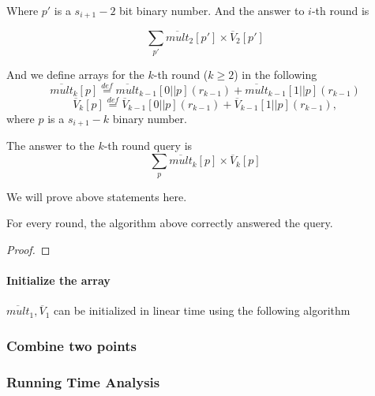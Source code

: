 Where $p'$ is a $s_{i+1}-2$ bit binary number. And the answer to $i$-th round is 

$$\sum_{p'}\overline{mult}_2[p']\times\overline{V}_2[p']$$

And we define arrays for the $k$-th round ($k\ge 2$) in the following
$$\overline{mult}_k[p]\overset{def}{=}\overline{mult}_{k-1}[0||p](r_{k-1})+\overline{mult}_{k-1}[1||p](r_{k-1})$$
$$\overline{V}_k[p]\overset{def}{=}\overline{V}_{k-1}[0||p](r_{k-1})+\overline{V}_{k-1}[1||p](r_{k-1}),$$
where $p$ is a $s_{i+1}-k$ binary number.

The answer to the $k$-th round query is 
$$\sum_{p}\overline{mult}_k[p]\times\overline{V}_k[p]$$

We will prove above statements here.

\begin{theorem} For every round, the algorithm above correctly answered the query.
\end{theorem}

\begin{proof}

\end{proof}

\paragraph{Initialize the array}
$\overline{mult}_1, \overline{V}_1$ can be initialized in linear time using the following algorithm
\subsubsection{Combine two points}
\subsubsection{Running Time Analysis}